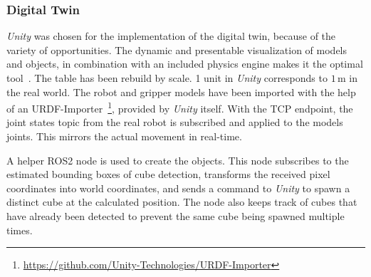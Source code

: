\documentclass{bmvc2k}
\begin{document}

\subsubsection{Digital Twin}
\label{dw:DT}
\textit{Unity} was chosen for the implementation of the digital twin, because of the variety of opportunities. The dynamic and presentable visualization of models and objects, in combination with an included physics engine makes it the optimal tool~\cite{singh_unity_2024}. The table has been rebuild by scale. 1 unit in \textit{Unity} corresponds to $1\,\mathrm{m}$ in the real world. The robot and gripper models have been imported with the help of an URDF-Importer~\footnote{\url{https://github.com/Unity-Technologies/URDF-Importer}}, provided by \textit{Unity} itself. With the TCP endpoint, the joint states topic from the real robot is subscribed and applied to the models joints. This mirrors the actual movement in real-time.

A helper ROS2 node is used to create the objects. This node subscribes to the estimated bounding boxes of cube detection, transforms the received pixel coordinates into world coordinates, and sends a command to \textit{Unity} to spawn a distinct cube at the calculated position. The node also keeps track of cubes that have already been detected to prevent the same cube being spawned multiple times.
\end{document}
